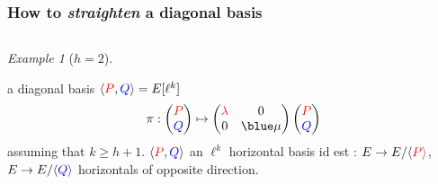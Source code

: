 \documentclass[10pt,a4paper]{beamer}
\theoremstyle{plain}
\theoremstyle{definition}
\theoremstyle{definition}
\theoremstyle{definition}
\theoremstyle{definition}
\theoremstyle{remark}
\theoremstyle{remark}
\newtheorem{exe}[thm]{Example}
\def\red#1{\textcolor{red}{#1}}
\def\blu#1{\textcolor{blue}{#1}}
\begin{document}
\begin{frame}
\frametitle{How to \textit{straighten} a diagonal basis}
\begin{columns}

\begin{column}{5.5cm}
\begin{exe}[$h=2$]
\begin{algorithmic}[1]
\REQUIRE a diagonal basis $\langle\red P,\blu Q\rangle = E[\ell^k]$ 
\[
\pi : 
\begin{pmatrix}\red P\\\blu Q\end{pmatrix}
\mapsto
\left( \begin{matrix}
\red{\lambda} & 0 \\
0 & \blue \mu 
\end{matrix} \right) 
\begin{pmatrix}\red P\\\blu Q\end{pmatrix}
\] assuming that $k \geqslant h+1$.
\ENSURE $\langle \red P, \blu Q \rangle$ an $\ell^k$  horizontal basis id est :
$E\rightarrow E/\langle \color{red}{P} \rangle $, $E\rightarrow E/\langle \color{blue}{Q} \rangle $ horizontals of opposite direction.
\end{algorithmic}

\end{exe}
\end{column}


\end{columns}
\end{frame}
\end{document}
